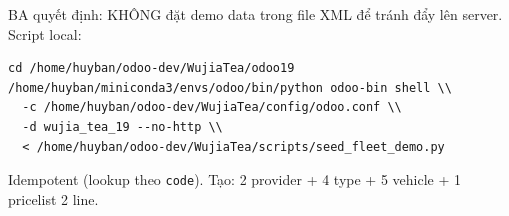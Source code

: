 BA quyết định: KHÔNG đặt demo data trong file XML để tránh đẩy lên server. Script local:

\begin{lstlisting}[style=shell]
cd /home/huyban/odoo-dev/WujiaTea/odoo19
/home/huyban/miniconda3/envs/odoo/bin/python odoo-bin shell \\
  -c /home/huyban/odoo-dev/WujiaTea/config/odoo.conf \\
  -d wujia_tea_19 --no-http \\
  < /home/huyban/odoo-dev/WujiaTea/scripts/seed_fleet_demo.py
\end{lstlisting}

Idempotent (lookup theo \texttt{code}). Tạo: 2 provider + 4 type + 5 vehicle + 1 pricelist 2 line.

